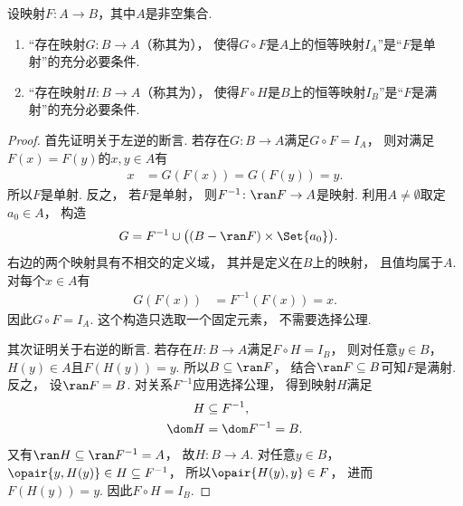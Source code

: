 \begin{theorem}
    设映射\(F\colon A \to B\)，其中\(A\)是非空集合.
    \begin{enumerate}
        \item “存在映射\(G\colon B \to A\)（称其为），
        使得\(G \circ F\)是\(A\)上的恒等映射\(I_A\)”是“\(F\)是单射”的充分必要条件.

        \item “存在映射\(H\colon B \to A\)（称其为），
        使得\(F \circ H\)是\(B\)上的恒等映射\(I_B\)”是“\(F\)是满射”的充分必要条件.
    \end{enumerate}
    \begin{proof}
        首先证明关于左逆的断言.
        若存在\(G\colon B\to A\)满足\(G\circ F=I_A\)，
        则对满足\(F(x)=F(y)\)的\(x,y\in A\)有
        \begin{align*}
            x &=G(F(x))=G(F(y))=y.
        \end{align*}
        所以\(F\)是单射.
        反之，
        若\(F\)是单射，
        则\(F^{-1}\colon\ran F\to A\)是映射.
        利用\(A\neq\emptyset\)取定\(a_0\in A\)，
        构造
        \begin{align*}
            G &=F^{-1}\cup\bigl((B-\ran F)\times\Set{a_0}\bigr).
        \end{align*}
        右边的两个映射具有不相交的定义域，
        其并是定义在\(B\)上的映射，
        且值均属于\(A\).
        对每个\(x\in A\)有
        \begin{align*}
            G(F(x)) &=F^{-1}(F(x))=x.
        \end{align*}
        因此\(G\circ F=I_A\).
        这个构造只选取一个固定元素，
        不需要选择公理.

        其次证明关于右逆的断言.
        若存在\(H\colon B\to A\)满足\(F\circ H=I_B\)，
        则对任意\(y\in B\)，
        \(H(y)\in A\)且\(F(H(y))=y\).
        所以\(B\subseteq\ran F\)，
        结合\(\ran F\subseteq B\)可知\(F\)是满射.
        反之，
        设\(\ran F=B\).
        对关系\(F^{-1}\)应用选择公理，
        得到映射\(H\)满足
        \begin{align*}
            H &\subseteq F^{-1}, \\
            \dom H &=\dom F^{-1}=B.
        \end{align*}
        又有\(\ran H\subseteq\ran F^{-1}=A\)，
        故\(H\colon B\to A\).
        对任意\(y\in B\)，
        \(\opair{y,H(y)}\in H\subseteq F^{-1}\)，
        所以\(\opair{H(y),y}\in F\)，
        进而\(F(H(y))=y\).
        因此\(F\circ H=I_B\).
    \end{proof}
\end{theorem}

